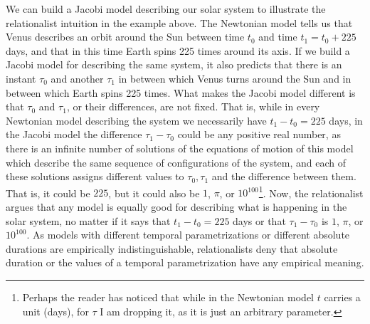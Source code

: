 \documentclass[12 pt]{article}
\begin{document}
We can build a Jacobi model describing our solar system to illustrate the relationalist intuition in the example above. The Newtonian model tells us that Venus describes an orbit around the Sun between time $t_0$ and time $t_1=t_0+225$ days, and that in this time Earth spins 225 times around its axis. If we build a Jacobi model for describing the same system, it also predicts that there is an instant $\tau_0$ and another $\tau_1$ in between which Venus turns around the Sun and in between which Earth spins 225 times. What makes the Jacobi model different is that $\tau_0$ and $\tau_1$, or their differences, are not fixed. That is, while in every Newtonian model describing the system we necessarily have $t_1-t_0=225$ days, in the Jacobi model the difference $\tau_1-\tau_0$ could be any positive real number, as there is an infinite number of solutions of the equations of motion of this model which describe the same sequence of configurations of the system, and each of these solutions assigns different values to $\tau _0, \tau_1$ and the difference between them. That is, it could be $225$, but it could also be $1$, $\pi$, or $10^{100}$\footnote{Perhaps the reader has noticed that while in the Newtonian model $t$ carries a unit (days), for $\tau$ I am dropping it, as it is just an arbitrary parameter.}. Now, the relationalist argues that any model is equally good for describing what is happening in the solar system, no matter if it says that $t_1-t_0=225$ days or that $\tau_1-\tau_0$ is $1$, $\pi$, or $10^{100}$. As models with different temporal parametrizations or different absolute durations are empirically indistinguishable, relationalists deny that absolute duration or the values of a temporal parametrization have any empirical meaning.
\end{document}

